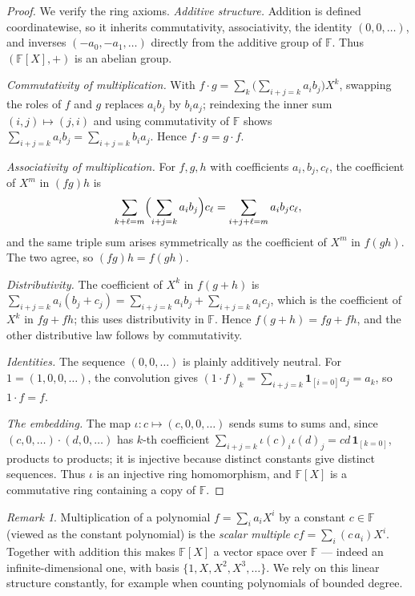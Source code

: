 \documentclass[11pt,a4paper]{article}
\theoremstyle{definition}
\theoremstyle{remark}
\newtheorem{remark}[theorem]{Remark}
\newcommand{\F}{\ensuremath{\mathbb{F}}}
\begin{document}
\begin{proof}
We verify the ring axioms. \emph{Additive structure.} Addition is defined
coordinatewise, so it inherits commutativity, associativity, the identity
\((0,0,\dots)\), and inverses \((-a_0, -a_1, \dots)\) directly from the additive
group of \(\F\). Thus \((\F[X], +)\) is an abelian group.

\emph{Commutativity of multiplication.} With
\(f \cdot g = \sum_k \bigl(\sum_{i+j=k} a_i b_j\bigr) X^k\), swapping the roles
of \(f\) and \(g\) replaces \(a_i b_j\) by \(b_i a_j\); reindexing the inner sum
\((i,j) \mapsto (j,i)\) and using commutativity of \(\F\) shows
\(\sum_{i+j=k} a_i b_j = \sum_{i+j=k} b_i a_j\). Hence \(f \cdot g = g \cdot f\).

\emph{Associativity of multiplication.} For \(f, g, h\) with coefficients
\(a_i, b_j, c_\ell\), the coefficient of \(X^m\) in \((fg)h\) is
\[
  \sum_{k + \ell = m}\Bigl(\sum_{i+j=k} a_i b_j\Bigr) c_\ell
  = \sum_{i + j + \ell = m} a_i b_j c_\ell,
\]
and the same triple sum arises symmetrically as the coefficient of \(X^m\) in
\(f(gh)\). The two agree, so \((fg)h = f(gh)\).

\emph{Distributivity.} The coefficient of \(X^k\) in \(f(g+h)\) is
\(\sum_{i+j=k} a_i (b_j + c_j) = \sum_{i+j=k} a_i b_j + \sum_{i+j=k} a_i c_j\),
which is the coefficient of \(X^k\) in \(fg + fh\); this uses distributivity in
\(\F\). Hence \(f(g+h) = fg + fh\), and the other distributive law follows by
commutativity.

\emph{Identities.} The sequence \((0,0,\dots)\) is plainly additively neutral.
For \(1 = (1,0,0,\dots)\), the convolution gives \((1 \cdot f)_k =
\sum_{i+j=k} \mathbf{1}_{[i=0]} a_j = a_k\), so \(1 \cdot f = f\).

\emph{The embedding.} The map \(\iota \colon c \mapsto (c,0,0,\dots)\) sends sums
to sums and, since \((c,0,\dots)\cdot(d,0,\dots)\) has \(k\)-th coefficient
\(\sum_{i+j=k}\iota(c)_i \iota(d)_j = cd\,\mathbf{1}_{[k=0]}\), products to
products; it is injective because distinct constants give distinct sequences.
Thus \(\iota\) is an injective ring homomorphism, and \(\F[X]\) is a commutative
ring containing a copy of \(\F\).
\end{proof}

\begin{remark}\label{polynomials:rem:scalar}
Multiplication of a polynomial \(f = \sum_i a_i X^i\) by a constant
\(c \in \F\) (viewed as the constant polynomial) is the
\emph{scalar multiple} \(cf = \sum_i (c\,a_i) X^i\). Together with addition this
makes \(\F[X]\) a vector space over \(\F\) — indeed an infinite-dimensional one,
with basis \(\{1, X, X^2, X^3, \dots\}\). We rely on this linear structure
constantly, for example when counting polynomials of bounded degree.
\end{remark}
\end{document}
